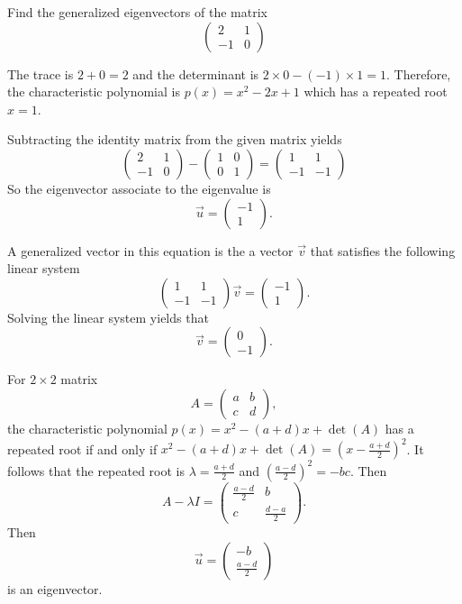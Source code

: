 \begin{example}
  Find the generalized eigenvectors of the matrix
  \[\begin{pmatrix}
    2&1\\
    -1&0
  \end{pmatrix}\]
\end{example}
\begin{solution}
  The trace is $2+0=2$ and the determinant is $2\times 0-(-1)\times 1=1$. Therefore, the characteristic polynomial is $p(x)=x^2-2x+1$ which has a repeated root $x=1$.

  Subtracting the identity matrix from the given matrix yields
  \[\begin{pmatrix}
    2&1\\
    -1&0
  \end{pmatrix}
  -\begin{pmatrix}
    1 & 0\\
    0 & 1
  \end{pmatrix}=
  \begin{pmatrix}
    1 & 1 \\
    -1 & -1
  \end{pmatrix}
  \]
  So the eigenvector associate to the eigenvalue is
  \[
    \vec{u}=
  \begin{pmatrix}
    -1 \\ 1
  \end{pmatrix}.  
  \]

  A generalized vector in this equation is the a vector $\vec{v}$ that satisfies the following linear system
  \[
    \begin{pmatrix}
    1&1\\
    -1&-1
  \end{pmatrix}
  \vec{v}=\begin{pmatrix}
    -1 \\ 1
  \end{pmatrix}.
  \]
  Solving the linear system yields that
  \[
  \vec{v}=\begin{pmatrix}
    0\\ -1
  \end{pmatrix}.  
  \]
\end{solution}

For $2\times 2$ matrix
\[
A=\begin{pmatrix}
  a & b \\
  c & d
\end{pmatrix}, 
\]
the characteristic polynomial $p(x)=x^2-(a+d)x+\det(A)$ has a repeated root if and only if $x^2-(a+d)x+\det(A)=\left(x-\frac{a+d}{2}\right)^2$. It follows that the repeated root is $\lambda=\frac{a+d}{2}$ and $\left(\frac{a-d}{2}\right)^2=-bc$. Then
\[
A-\lambda I=
\begin{pmatrix}
  \frac{a-d}{2} & b\\
  c & \frac{d-a}{2}
\end{pmatrix}.  
\]
Then 
\[
  \vec{u}=
  \begin{pmatrix}
    -b \\ \frac{a-d}{2}
  \end{pmatrix}
\]
is an eigenvector.

